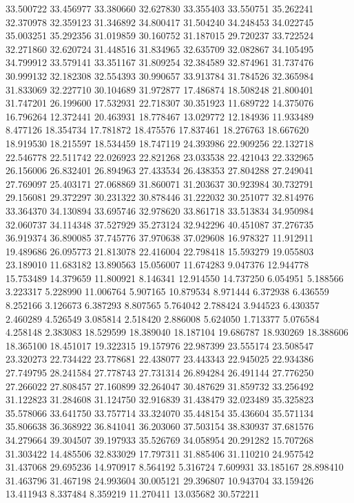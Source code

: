 33.500722
33.456977
33.380660
32.627830
33.355403
33.550751
35.262241
32.370978
32.359123
31.346892
34.800417
31.504240
34.248453
34.022745
35.003251
35.292356
31.019859
30.160752
31.187015
29.720237
33.722524
32.271860
32.620724
31.448516
31.834965
32.635709
32.082867
34.105495
34.799912
33.579141
33.351167
31.809254
32.384589
32.874961
31.737476
30.999132
32.182308
32.554393
30.990657
33.913784
31.784526
32.365984
31.833069
32.227710
30.104689
31.972877
17.486874
18.508248
21.800401
31.747201
26.199600
17.532931
22.718307
30.351923
11.689722
14.375076
16.796264
12.372441
20.463931
18.778467
13.029772
12.184936
11.933489
8.477126
18.354734
17.781872
18.475576
17.837461
18.276763
18.667620
18.919530
18.215597
18.534459
18.747119
24.393986
22.909256
22.132718
22.546778
22.511742
22.026923
22.821268
23.033538
22.421043
22.332965
26.156006
26.832401
26.894963
27.433534
26.438353
27.804288
27.249041
27.769097
25.403171
27.068869
31.860071
31.203637
30.923984
30.732791
29.156081
29.372297
30.231322
30.878446
31.222032
30.251077
32.814976
33.364370
34.130894
33.695746
32.978620
33.861718
33.513834
34.950984
32.060737
34.114348
37.527929
35.273124
32.942296
40.451087
37.276735
36.919374
36.890085
37.745776
37.970638
37.029608
16.978327
11.912911
19.489686
26.095773
21.813078
22.416004
22.798418
15.593279
19.055803
23.189010
11.683182
13.890563
15.056007
11.674283
9.047376
12.944778
15.753489
14.379659
11.800921
8.146341
12.914550
14.737250
6.054951
5.188566
3.223317
5.228990
11.006764
5.907165
10.879534
8.971444
6.372938
6.436559
8.252166
3.126673
6.387293
8.807565
5.764042
2.788424
3.944523
6.430357
2.460289
4.526549
3.085814
2.518420
2.886008
5.624050
1.713377
5.076584
4.258148
2.383083
18.529599
18.389040
18.187104
19.686787
18.930269
18.388606
18.365100
18.451017
19.322315
19.157976
22.987399
23.555174
23.508547
23.320273
22.734422
23.778681
22.438077
23.443343
22.945025
22.934386
27.749795
28.241584
27.778743
27.731314
26.894284
26.491144
27.776250
27.266022
27.808457
27.160899
32.264047
30.487629
31.859732
33.256492
31.122823
31.284608
31.124750
32.916839
31.438479
32.023489
35.325823
35.578066
33.641750
33.757714
33.324070
35.448154
35.436604
35.571134
35.806638
36.368922
36.841041
36.203060
37.503154
38.830937
37.681576
34.279664
39.304507
39.197933
35.526769
34.058954
20.291282
15.707268
31.303422
14.485506
32.833029
17.797311
31.885406
31.110210
24.957542
31.437068
29.695236
14.970917
8.564192
5.316724
7.609931
33.185167
28.898410
31.463796
31.467198
24.993604
30.005121
29.396807
10.943704
33.159426
13.411943
8.337484
8.359219
11.270411
13.035682
30.572211
